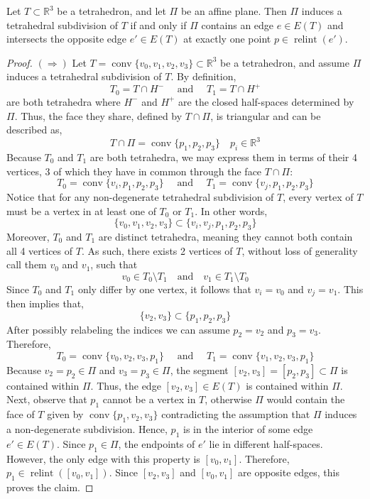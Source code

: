 \documentclass{mainresearch}
\begin{document}
\begin{lemma}\label{TS}
	Let $T \subset \mathbb{R}^3$ be a tetrahedron, and let $\Pi$ be an affine plane. Then $\Pi$ induces a tetrahedral subdivision of $T$ if and only if $\Pi$ contains an edge $e \in E(T)$ and intersects the opposite edge $e' \in E(T)$ at exactly one point $p \in \operatorname{relint}(e')$.
\end{lemma}
\begin{proof}
	$(\Rightarrow)$ Let $T = \operatorname{conv}\{v_0,v_1,v_2,v_3\} \subset \mathbb{R}^3$ be a tetrahedron, and assume $\Pi$ induces a tetrahedral subdivision of $T$. By definition,
	\[
	T_0=T\cap H^- \quad \text{ and } \quad T_1=T\cap H^+
	\]
	are both tetrahedra where $H^-$ and $H^+$ are the closed half-spaces determined by $\Pi$. Thus, the face they share, defined by $T \cap \Pi$, is triangular and can be described as,
	\[
	T \cap \Pi = \operatorname{conv}\{p_1,p_2,p_3\} \quad p_i\in \mathbb{R}^3
	\]
	Because $T_0$ and $T_1$ are both tetrahedra, we may express them in terms of their 4 vertices, 3 of which they have in common through the face $T \cap \Pi$:
	\[
	T_0=\operatorname{conv}\{v_i,p_1,p_2,p_3\} \quad \text{ and } \quad T_1 = \operatorname{conv}\{v_j,p_1,p_2,p_3\}
	\]
	Notice that for any non-degenerate tetrahedral subdivision of $T$, every vertex of $T$ must be a vertex in at least one of $T_0$ or $T_1$. In other words,
	\[
	\{v_0,v_1,v_2,v_3\}\subset \{v_i,v_j,p_1,p_2,p_3\}
	\]
	Moreover, $T_0$ and $T_1$ are distinct tetrahedra, meaning they cannot both contain all 4 vertices of $T$. As such, there exists 2 vertices of $T$, without loss of generality call them $v_0$ and $v_1$, such that 
	\[
	v_0\in T_0 \setminus T_1 \quad \text{and} \quad v_1\in T_1 \setminus T_0
	\]
	Since $T_0$ and $T_1$ only differ by one vertex, it follows that $v_i = v_0$ and $v_j = v_1$.
	This then implies that,
	\[
	\{v_2,v_3\}\subset \{p_1,p_2,p_3\}
	\]
	After possibly relabeling the indices we can assume $p_2 = v_2$ and $p_3 = v_3$. Therefore,
	\[
	T_0=\operatorname{conv}\{v_0,v_2,v_3,p_1\} \quad \text{ and } \quad T_1 = \operatorname{conv}\{v_1,v_2,v_3,p_1\}
	\]
	Because $v_2 = p_2 \in \Pi$ and $v_3=p_3 \in \Pi$, the segment $[v_2,v_3]=[p_2,p_3] \subset \Pi$ is contained within $\Pi$. Thus, the edge $[v_2,v_3] \in E(T)$ is contained within $\Pi$. Next, observe that $p_1$ cannot be a vertex in $T$, otherwise $\Pi$ would contain the face of $T$ given by $\operatorname{conv}\{p_1,v_2,v_3\}$ contradicting the assumption that $\Pi$ induces a non-degenerate subdivision. Hence, $p_1$ is in the interior of some edge $e'\in E(T)$. Since $p_1\in \Pi$, the endpoints of $e'$ lie in different half-spaces. However, the only edge with this property is $[v_0,v_1]$. Therefore, $p_1\in \operatorname{relint}([v_0,v_1])$. Since $[v_2,v_3]$ and $[v_0,v_1]$ are opposite edges, this proves the claim.		
	

\end{proof}
\end{document}
